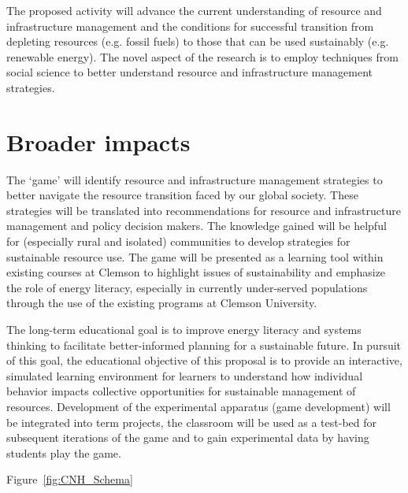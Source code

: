 \documentclass[11pt,a4paper]{article}
\begin{document}
The proposed activity will advance the current understanding of 
resource and infrastructure management and 
the conditions for successful transition from depleting resources (e.g. fossil fuels) 
to those that can be used sustainably (e.g. renewable energy). 
The novel aspect of the research is to employ techniques from social science 
to better understand resource and infrastructure management strategies.

\vspace*{-0.1in}
\section*{Broader impacts}
\vspace*{-0.1in}


The `game' will identify resource and infrastructure management strategies 
to better navigate the resource transition faced by our global society. 
These strategies will be translated into recommendations for 
resource and infrastructure management and policy decision makers. 
The knowledge gained will be helpful for (especially rural and isolated) communities 
to develop strategies for sustainable resource use. 
The game will be presented as a learning tool within existing courses at Clemson 
to highlight issues of sustainability and emphasize the role of energy literacy, 
especially in currently under-served populations 
through the use of the existing programs at Clemson University.  

The long-term educational goal is to 
improve energy literacy and systems thinking 
to facilitate better-informed planning for a sustainable future. 
In pursuit of this goal, the educational objective of this proposal 
is to provide an interactive, simulated learning environment for learners 
to understand how individual behavior impacts collective opportunities 
for sustainable management of resources. 
Development of the experimental apparatus (game development) will be integrated into term projects, 
the classroom will be used as a test-bed for subsequent iterations of the game 
and to gain experimental data by having students play the game. 

Figure~\ref{fig:CNH_Schema}
\end{document}
